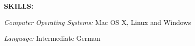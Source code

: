 
{\large \textbf{SKILLS:}}
\begin{compactitem} 
\item \textit{Computer Operating Systems:} Mac OS X, Linux and Windows
\item \textit{Language:} Intermediate German
\bigskip
\end{compactitem}
